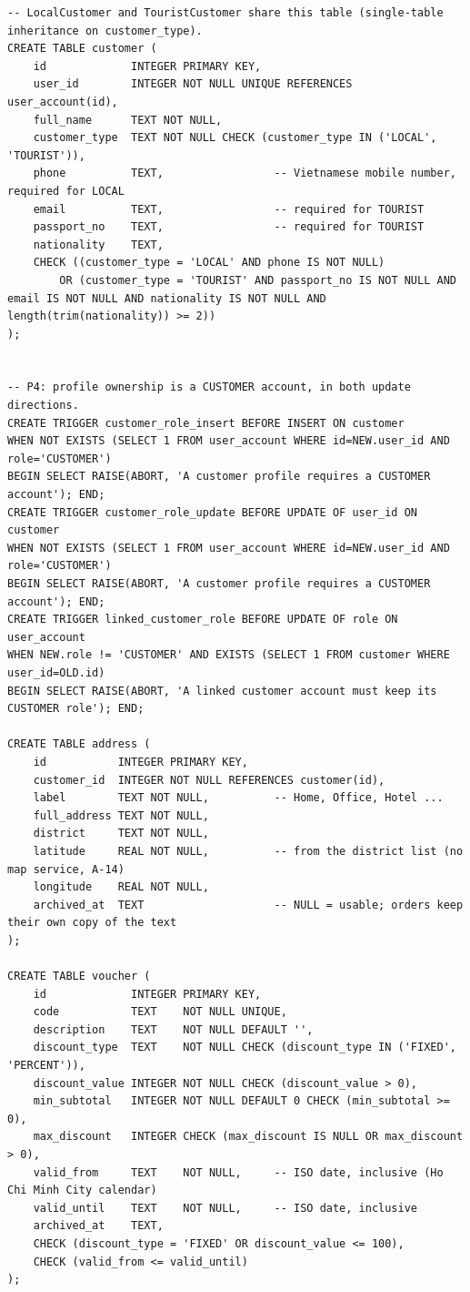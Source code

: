 \begin{lstlisting}
-- LocalCustomer and TouristCustomer share this table (single-table inheritance on customer_type).
CREATE TABLE customer (
    id             INTEGER PRIMARY KEY,
    user_id        INTEGER NOT NULL UNIQUE REFERENCES user_account(id),
    full_name      TEXT NOT NULL,
    customer_type  TEXT NOT NULL CHECK (customer_type IN ('LOCAL', 'TOURIST')),
    phone          TEXT,                 -- Vietnamese mobile number, required for LOCAL
    email          TEXT,                 -- required for TOURIST
    passport_no    TEXT,                 -- required for TOURIST
    nationality    TEXT,
    CHECK ((customer_type = 'LOCAL' AND phone IS NOT NULL)
        OR (customer_type = 'TOURIST' AND passport_no IS NOT NULL AND email IS NOT NULL AND nationality IS NOT NULL AND length(trim(nationality)) >= 2))
);


-- P4: profile ownership is a CUSTOMER account, in both update directions.
CREATE TRIGGER customer_role_insert BEFORE INSERT ON customer
WHEN NOT EXISTS (SELECT 1 FROM user_account WHERE id=NEW.user_id AND role='CUSTOMER')
BEGIN SELECT RAISE(ABORT, 'A customer profile requires a CUSTOMER account'); END;
CREATE TRIGGER customer_role_update BEFORE UPDATE OF user_id ON customer
WHEN NOT EXISTS (SELECT 1 FROM user_account WHERE id=NEW.user_id AND role='CUSTOMER')
BEGIN SELECT RAISE(ABORT, 'A customer profile requires a CUSTOMER account'); END;
CREATE TRIGGER linked_customer_role BEFORE UPDATE OF role ON user_account
WHEN NEW.role != 'CUSTOMER' AND EXISTS (SELECT 1 FROM customer WHERE user_id=OLD.id)
BEGIN SELECT RAISE(ABORT, 'A linked customer account must keep its CUSTOMER role'); END;

CREATE TABLE address (
    id           INTEGER PRIMARY KEY,
    customer_id  INTEGER NOT NULL REFERENCES customer(id),
    label        TEXT NOT NULL,          -- Home, Office, Hotel ...
    full_address TEXT NOT NULL,
    district     TEXT NOT NULL,
    latitude     REAL NOT NULL,          -- from the district list (no map service, A-14)
    longitude    REAL NOT NULL,
    archived_at  TEXT                    -- NULL = usable; orders keep their own copy of the text
);

CREATE TABLE voucher (
    id             INTEGER PRIMARY KEY,
    code           TEXT    NOT NULL UNIQUE,
    description    TEXT    NOT NULL DEFAULT '',
    discount_type  TEXT    NOT NULL CHECK (discount_type IN ('FIXED', 'PERCENT')),
    discount_value INTEGER NOT NULL CHECK (discount_value > 0),
    min_subtotal   INTEGER NOT NULL DEFAULT 0 CHECK (min_subtotal >= 0),
    max_discount   INTEGER CHECK (max_discount IS NULL OR max_discount > 0),
    valid_from     TEXT    NOT NULL,     -- ISO date, inclusive (Ho Chi Minh City calendar)
    valid_until    TEXT    NOT NULL,     -- ISO date, inclusive
    archived_at    TEXT,
    CHECK (discount_type = 'FIXED' OR discount_value <= 100),
    CHECK (valid_from <= valid_until)
);


\end{lstlisting}

